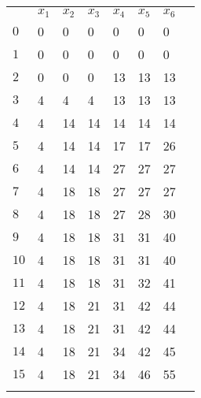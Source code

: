 \documentclass[12pt]{article}
\begin{document}
\begin{tabular}{l *{6}{>{}l} l}
\rowcolor{white}%
& $x_{1}$ & $x_{2}$ & $x_{3}$ & $x_{4}$ & $x_{5}$ & $x_{6}$ \\
$0$ & \cellcolor{red!20}0 & \cellcolor{red!20}0 & \cellcolor{red!20}0 & \cellcolor{red!20}0 & \cellcolor{red!20}0 & \cellcolor{red!20}0 \\
$1$ & \cellcolor{red!20}0 & \cellcolor{red!20}0 & \cellcolor{red!20}0 & \cellcolor{red!20}0 & \cellcolor{red!20}0 & \cellcolor{red!20}0 \\
$2$ & \cellcolor{red!20}0 & \cellcolor{red!20}0 & \cellcolor{red!20}0 & \cellcolor{green!20}13 & \cellcolor{red!20}13 & \cellcolor{red!20}13 \\
$3$ & \cellcolor{green!20}4 & \cellcolor{red!20}4 & \cellcolor{red!20}4 & \cellcolor{green!20}13 & \cellcolor{red!20}13 & \cellcolor{red!20}13 \\
$4$ & \cellcolor{green!20}4 & \cellcolor{green!20}14 & \cellcolor{red!20}14 & \cellcolor{red!20}14 & \cellcolor{red!20}14 & \cellcolor{red!20}14 \\
$5$ & \cellcolor{green!20}4 & \cellcolor{green!20}14 & \cellcolor{red!20}14 & \cellcolor{green!20}17 & \cellcolor{red!20}17 & \cellcolor{green!20}26 \\
$6$ & \cellcolor{green!20}4 & \cellcolor{green!20}14 & \cellcolor{red!20}14 & \cellcolor{green!20}27 & \cellcolor{red!20}27 & \cellcolor{red!20}27 \\
$7$ & \cellcolor{green!20}4 & \cellcolor{green!20}18 & \cellcolor{red!20}18 & \cellcolor{green!20}27 & \cellcolor{red!20}27 & \cellcolor{red!20}27 \\
$8$ & \cellcolor{green!20}4 & \cellcolor{green!20}18 & \cellcolor{red!20}18 & \cellcolor{green!20}27 & \cellcolor{green!20}28 & \cellcolor{green!20}30 \\
$9$ & \cellcolor{green!20}4 & \cellcolor{green!20}18 & \cellcolor{red!20}18 & \cellcolor{green!20}31 & \cellcolor{red!20}31 & \cellcolor{green!20}40 \\
$10$ & \cellcolor{green!20}4 & \cellcolor{green!20}18 & \cellcolor{red!20}18 & \cellcolor{green!20}31 & \cellcolor{red!20}31 & \cellcolor{green!20}40 \\
$11$ & \cellcolor{green!20}4 & \cellcolor{green!20}18 & \cellcolor{red!20}18 & \cellcolor{green!20}31 & \cellcolor{green!20}32 & \cellcolor{green!20}41 \\
$12$ & \cellcolor{green!20}4 & \cellcolor{green!20}18 & \cellcolor{green!20}21 & \cellcolor{green!20}31 & \cellcolor{green!20}42 & \cellcolor{green!20}44 \\
$13$ & \cellcolor{green!20}4 & \cellcolor{green!20}18 & \cellcolor{green!20}21 & \cellcolor{green!20}31 & \cellcolor{green!20}42 & \cellcolor{green!20}44 \\
$14$ & \cellcolor{green!20}4 & \cellcolor{green!20}18 & \cellcolor{green!20}21 & \cellcolor{green!20}34 & \cellcolor{green!20}42 & \cellcolor{green!20}45 \\
$15$ & \cellcolor{green!20}4 & \cellcolor{green!20}18 & \cellcolor{green!20}21 & \cellcolor{green!20}34 & \cellcolor{green!20}46 & \cellcolor{green!20}55 \\
\rowcolor{white}%
\end{tabular}\\
\end{document}
